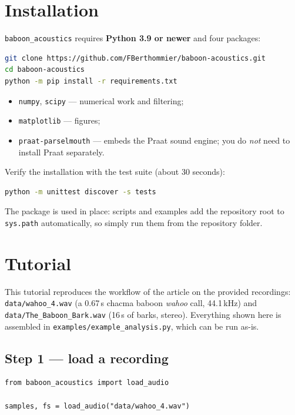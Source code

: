 \documentclass[11pt,a4paper]{article}
\newcommand{\pkg}{\texttt{baboon\_acoustics}}
\begin{document}
\section{Installation}

\pkg{} requires \textbf{Python 3.9 or newer} and four packages:

\begin{lstlisting}[language=bash]
git clone https://github.com/FBerthommier/baboon-acoustics.git
cd baboon-acoustics
python -m pip install -r requirements.txt
\end{lstlisting}

\begin{itemize}
\item \texttt{numpy}, \texttt{scipy} --- numerical work and filtering;
\item \texttt{matplotlib} --- figures;
\item \texttt{praat-parselmouth} --- embeds the Praat sound engine; you
do \emph{not} need to install Praat separately.
\end{itemize}

Verify the installation with the test suite (about 30 seconds):

\begin{lstlisting}[language=bash]
python -m unittest discover -s tests
\end{lstlisting}

The package is used in place: scripts and examples add the repository
root to \texttt{sys.path} automatically, so simply run them from the
repository folder.

\section{Tutorial}

This tutorial reproduces the workflow of the article on the provided
recordings: \texttt{data/wahoo\_4.wav} (a 0.67\,s chacma baboon
\emph{wahoo} call, 44.1\,kHz) and \texttt{data/The\_Baboon\_Bark.wav}
(16\,s of barks, stereo). Everything shown here is assembled in
\texttt{examples/example\_analysis.py}, which can be run as-is.

\subsection{Step 1 --- load a recording}

\begin{lstlisting}
from baboon_acoustics import load_audio

samples, fs = load_audio("data/wahoo_4.wav")
\end{lstlisting}
\end{document}
